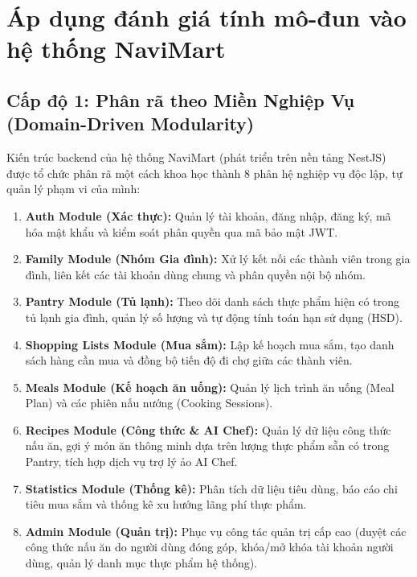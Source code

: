 \documentclass[12pt,a4paper]{article}
\begin{document}
\section{Áp dụng đánh giá tính mô-đun vào hệ thống NaviMart}

\subsection{Cấp độ 1: Phân rã theo Miền Nghiệp Vụ (Domain-Driven Modularity)}
Kiến trúc backend của hệ thống NaviMart (phát triển trên nền tảng NestJS) được tổ chức phân rã một cách khoa học thành 8 phân hệ nghiệp vụ độc lập, tự quản lý phạm vi của mình:
\begin{enumerate}
    \item \textbf{Auth Module (Xác thực):} Quản lý tài khoản, đăng nhập, đăng ký, mã hóa mật khẩu và kiểm soát phân quyền qua mã bảo mật JWT.
    \item \textbf{Family Module (Nhóm Gia đình):} Xử lý kết nối các thành viên trong gia đình, liên kết các tài khoản dùng chung và phân quyền nội bộ nhóm.
    \item \textbf{Pantry Module (Tủ lạnh):} Theo dõi danh sách thực phẩm hiện có trong tủ lạnh gia đình, quản lý số lượng và tự động tính toán hạn sử dụng (HSD).
    \item \textbf{Shopping Lists Module (Mua sắm):} Lập kế hoạch mua sắm, tạo danh sách hàng cần mua và đồng bộ tiến độ đi chợ giữa các thành viên.
    \item \textbf{Meals Module (Kế hoạch ăn uống):} Quản lý lịch trình ăn uống (Meal Plan) và các phiên nấu nướng (Cooking Sessions).
    \item \textbf{Recipes Module (Công thức \& AI Chef):} Quản lý dữ liệu công thức nấu ăn, gợi ý món ăn thông minh dựa trên lượng thực phẩm sẵn có trong Pantry, tích hợp dịch vụ trợ lý ảo AI Chef.
    \item \textbf{Statistics Module (Thống kê):} Phân tích dữ liệu tiêu dùng, báo cáo chi tiêu mua sắm và thống kê xu hướng lãng phí thực phẩm.
    \item \textbf{Admin Module (Quản trị):} Phục vụ công tác quản trị cấp cao (duyệt các công thức nấu ăn do người dùng đóng góp, khóa/mở khóa tài khoản người dùng, quản lý danh mục thực phẩm hệ thống).
\end{enumerate}
\end{document}
